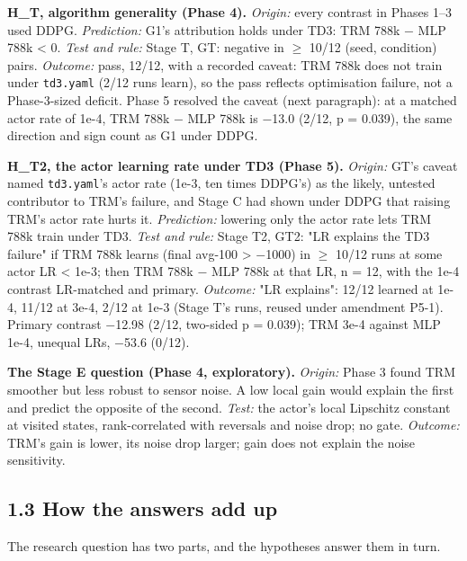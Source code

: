 \documentclass[11pt]{article}
\begin{document}
\textbf{H\_T, algorithm generality (Phase 4).} \emph{Origin:} every contrast in Phases 1--3 used DDPG. \emph{Prediction:} G1's attribution holds under TD3: TRM 788k $-$ MLP 788k < 0. \emph{Test and rule:} Stage T, GT: negative in $\geq$ 10/12 (seed, condition) pairs. \emph{Outcome:} pass, 12/12, with a recorded caveat: TRM 788k does not train under \texttt{td3.yaml} (2/12 runs learn), so the pass reflects optimisation failure, not a Phase-3-sized deficit. Phase 5 resolved the caveat (next paragraph): at a matched actor rate of 1e-4, TRM 788k $-$ MLP 788k is $-$13.0 (2/12, p = 0.039), the same direction and sign count as G1 under DDPG.



\textbf{H\_T2, the actor learning rate under TD3 (Phase 5).} \emph{Origin:} GT's caveat named \texttt{td3.yaml}'s actor rate (1e-3, ten times DDPG's) as the likely, untested contributor to TRM's failure, and Stage C had shown under DDPG that raising TRM's actor rate hurts it. \emph{Prediction:} lowering only the actor rate lets TRM 788k train under TD3. \emph{Test and rule:} Stage T2, GT2: "LR explains the TD3 failure" if TRM 788k learns (final avg-100 > $-$1000) in $\geq$ 10/12 runs at some actor LR < 1e-3; then TRM 788k $-$ MLP 788k at that LR, n = 12, with the 1e-4 contrast LR-matched and primary. \emph{Outcome:} "LR explains": 12/12 learned at 1e-4, 11/12 at 3e-4, 2/12 at 1e-3 (Stage T's runs, reused under amendment P5-1). Primary contrast $-$12.98 (2/12, two-sided p = 0.039); TRM 3e-4 against MLP 1e-4, unequal LRs, $-$53.6 (0/12).



\textbf{The Stage E question (Phase 4, exploratory).} \emph{Origin:} Phase 3 found TRM smoother but less robust to sensor noise. A low local gain would explain the first and predict the opposite of the second. \emph{Test:} the actor's local Lipschitz constant at visited states, rank-correlated with reversals and noise drop; no gate. \emph{Outcome:} TRM's gain is lower, its noise drop larger; gain does not explain the noise sensitivity.



\subsection*{1.3 How the answers add up}



The research question has two parts, and the hypotheses answer them in turn.
\end{document}
